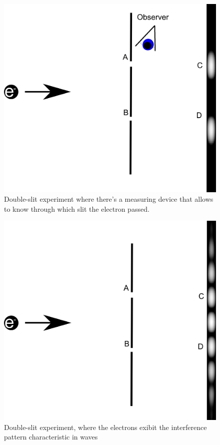 \begin{figure}[h]
\centering 
\includegraphics[scale=0.15]{Overview/Figures/ds_ob.png}
\caption{Double-slit experiment where there's a measuring device that allows to know through which slit the electron passed.}
\label{fig:double_slit_ob}

\end{figure}
\begin{figure}[h]
\centering 

\includegraphics[scale=0.15]{Overview/Figures/ds_unob.png}
\caption{Double-slit experiment, where the electrons exibit the interference pattern characteristic in waves}
\label{fig:double_slit_unob}
\end{figure}

